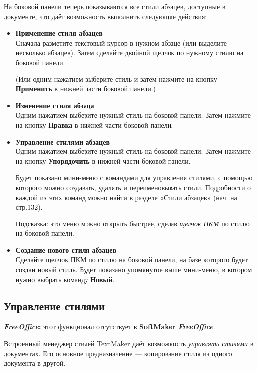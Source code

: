 \documentclass[a4paper,10pt]{article}
\begin{document}
На боковой панели теперь показываются все стили абзацев, доступные в документе, что даёт возможность выполнить следующие действия:
\begin{itemize}
 \item \textbf{Применение стиля абзацев}\\
 Сначала разметите текстовый курсор в нужном абзаце (или выделите несколько абзацев). Затем сделайте двойной щелчок по нужному стилю на боковой панели.
 
 (Или одним нажатием выберите стиль и затем нажмите на кнопку \textbf{Применить} в нижней части боковой панели.)
 \item \textbf{Изменение стиля абзаца}\\
 Одним нажатием выберите нужный стиль на боковой панели. Затем нажмите на кнопку \textbf{Правка} в нижней части боковой панели.
 \item \textbf{Управление стилями абзацев}\\
 Одним нажатием выберите нужный стиль на боковой панели. Затем нажмите на кнопку \textbf{Упорядочить} в нижней части боковой панели.
 
 Будет показано мини-меню с командами для управления стилями, с помощью которого можно создавать, удалять и переименовывать стили. Подробности о каждой из этих команд можно найти в разделе «Стили абзацев» (нач. на стр.132).
 
Подсказка: это меню можно открыть быстрее, сделав \textit{щелчок ПКМ} по стилю на боковой панели.
\item \textbf{Создание нового стиля абзацев}\\
Сделайте щелчок ПКМ по стилю на боковой панели, на базе которого будет создан новый стиль. Будет показано упомянутое выше мини-меню, в котором нужно выбрать команду \textbf{Новый}.
\end{itemize}

\subsection{Управление стилями}
\begin{mdframed}[backgroundcolor=pink!50]
\textbf{\textit{FreeOffice}:} этот функционал отсутствует в \textbf{SoftMaker \textit{FreeOffice}}.
\end{mdframed}

Встроенный менеджер стилей TextMaker даёт возможность \textit{управлять стилями} в документах. Его основное предназначение --- копирование стиля из одного документа в другой. 
\end{document}
